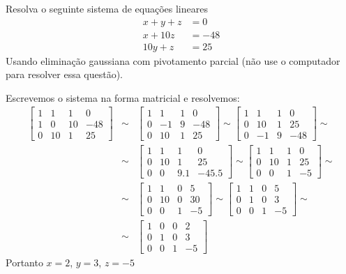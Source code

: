 \begin{exer} Resolva o seguinte sistema de equações lineares
\begin{equation}
  \begin{split}
    x+y+z&=0\\
    x+10z&=-48\\
    10y+z&=25
  \end{split}
\end{equation} 
Usando eliminação gaussiana com pivotamento parcial (não use o computador para resolver essa questão).
\end{exer}
\begin{resp}
Escrevemos o sistema na forma matricial e resolvemos:
\begin{eqnarray}
\left[
\begin{array}{ccc|c}
1&1&1&0\\
1&0&10&-48\\
0&10&1&25
\end{array}\right] &\sim&
\left[
\begin{array}{ccc|c}
1&1&1&0\\
0&-1&9&-48\\
0&10&1&25
\end{array}\right] \sim
\left[
\begin{array}{ccc|c}
1&1&1&0\\
0&10&1&25\\
0&-1&9&-48
\end{array}\right]\sim\\
&\sim&\left[
\begin{array}{ccc|c}
1&1&1&0\\
0&10&1&25\\
0&0&9.1&-45.5
\end{array}\right]\sim
\left[
\begin{array}{ccc|c}
1&1&1&0\\
0&10&1&25\\
0&0&1&-5
\end{array}\right]\sim\\
&\sim&\left[
\begin{array}{ccc|c}
1&1&0&5\\
0&10&0&30\\
0&0&1&-5
\end{array}\right]
\sim\left[
\begin{array}{ccc|c}
1&1&0&5\\
0&1&0&3\\
0&0&1&-5
\end{array}\right]\sim\\
&\sim&\left[
\begin{array}{ccc|c}
1&0&0&2\\
0&1&0&3\\
0&0&1&-5
\end{array}\right]
\end{eqnarray}
Portanto $x=2$, $y=3$, $z=-5$

\end{resp}


